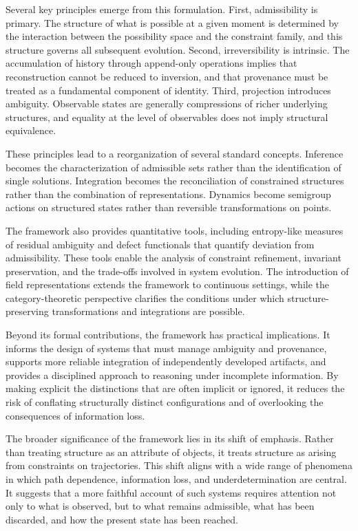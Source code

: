 \documentclass[11pt,oneside]{article}
\begin{document}
Several key principles emerge from this formulation. First, admissibility is primary. The structure of what is possible at a given moment is determined by the interaction between the possibility space and the constraint family, and this structure governs all subsequent evolution. Second, irreversibility is intrinsic. The accumulation of history through append-only operations implies that reconstruction cannot be reduced to inversion, and that provenance must be treated as a fundamental component of identity. Third, projection introduces ambiguity. Observable states are generally compressions of richer underlying structures, and equality at the level of observables does not imply structural equivalence.

These principles lead to a reorganization of several standard concepts. Inference becomes the characterization of admissible sets rather than the identification of single solutions. Integration becomes the reconciliation of constrained structures rather than the combination of representations. Dynamics become semigroup actions on structured states rather than reversible transformations on points.

The framework also provides quantitative tools, including entropy-like measures of residual ambiguity and defect functionals that quantify deviation from admissibility. These tools enable the analysis of constraint refinement, invariant preservation, and the trade-offs involved in system evolution. The introduction of field representations extends the framework to continuous settings, while the category-theoretic perspective clarifies the conditions under which structure-preserving transformations and integrations are possible.

Beyond its formal contributions, the framework has practical implications. It informs the design of systems that must manage ambiguity and provenance, supports more reliable integration of independently developed artifacts, and provides a disciplined approach to reasoning under incomplete information. By making explicit the distinctions that are often implicit or ignored, it reduces the risk of conflating structurally distinct configurations and of overlooking the consequences of information loss.

The broader significance of the framework lies in its shift of emphasis. Rather than treating structure as an attribute of objects, it treats structure as arising from constraints on trajectories. This shift aligns with a wide range of phenomena in which path dependence, information loss, and underdetermination are central. It suggests that a more faithful account of such systems requires attention not only to what is observed, but to what remains admissible, what has been discarded, and how the present state has been reached.
\end{document}
